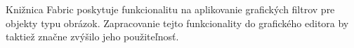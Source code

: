Knižnica Fabric poskytuje funkcionalitu na aplikovanie grafických filtrov pre objekty typu obrázok. Zapracovanie tejto funkcionality do grafického editora by taktiež značne zvýšilo jeho použiteľnosť.
%
%
%
%
%	
%
%
